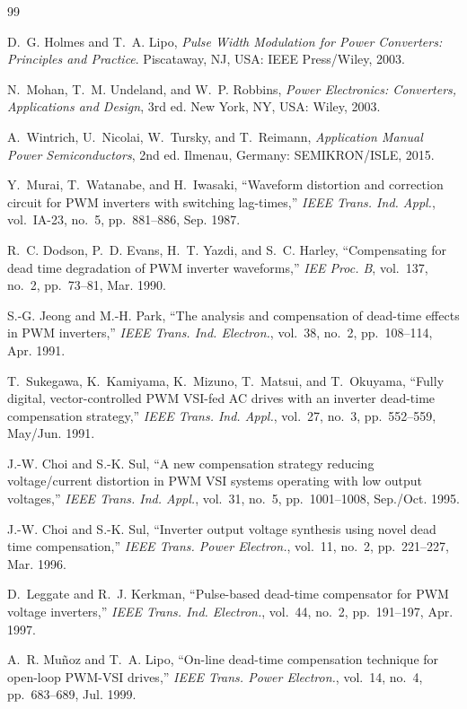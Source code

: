 \documentclass[11pt,a4paper]{article}
\begin{document}
\begin{thebibliography}{99}
\sloppy

D.~G. Holmes and T.~A. Lipo, \emph{Pulse Width Modulation for Power Converters:
Principles and Practice}. Piscataway, NJ, USA: IEEE Press/Wiley, 2003.

N.~Mohan, T.~M. Undeland, and W.~P. Robbins, \emph{Power Electronics: Converters,
Applications and Design}, 3rd ed. New York, NY, USA: Wiley, 2003.

A.~Wintrich, U.~Nicolai, W.~Tursky, and T.~Reimann, \emph{Application Manual Power
Semiconductors}, 2nd ed. Ilmenau, Germany: SEMIKRON/ISLE, 2015.

Y.~Murai, T.~Watanabe, and H.~Iwasaki, ``Waveform distortion and correction circuit for
PWM inverters with switching lag-times,'' \emph{IEEE Trans. Ind. Appl.}, vol.~IA-23,
no.~5, pp.~881--886, Sep. 1987.

R.~C. Dodson, P.~D. Evans, H.~T. Yazdi, and S.~C. Harley, ``Compensating for dead time
degradation of PWM inverter waveforms,'' \emph{IEE Proc. B}, vol.~137, no.~2,
pp.~73--81, Mar. 1990.

S.-G. Jeong and M.-H. Park, ``The analysis and compensation of dead-time effects in PWM
inverters,'' \emph{IEEE Trans. Ind. Electron.}, vol.~38, no.~2, pp.~108--114, Apr. 1991.

T.~Sukegawa, K.~Kamiyama, K.~Mizuno, T.~Matsui, and T.~Okuyama, ``Fully digital,
vector-controlled PWM VSI-fed AC drives with an inverter dead-time compensation
strategy,'' \emph{IEEE Trans. Ind. Appl.}, vol.~27, no.~3, pp.~552--559, May/Jun. 1991.

J.-W. Choi and S.-K. Sul, ``A new compensation strategy reducing voltage/current
distortion in PWM VSI systems operating with low output voltages,'' \emph{IEEE Trans.
Ind. Appl.}, vol.~31, no.~5, pp.~1001--1008, Sep./Oct. 1995.

J.-W. Choi and S.-K. Sul, ``Inverter output voltage synthesis using novel dead time
compensation,'' \emph{IEEE Trans. Power Electron.}, vol.~11, no.~2, pp.~221--227,
Mar. 1996.

D.~Leggate and R.~J. Kerkman, ``Pulse-based dead-time compensator for PWM voltage
inverters,'' \emph{IEEE Trans. Ind. Electron.}, vol.~44, no.~2, pp.~191--197, Apr. 1997.

A.~R. Mu\~{n}oz and T.~A. Lipo, ``On-line dead-time compensation technique for open-loop
PWM-VSI drives,'' \emph{IEEE Trans. Power Electron.}, vol.~14, no.~4, pp.~683--689,
Jul. 1999.


\end{thebibliography}
\end{document}
